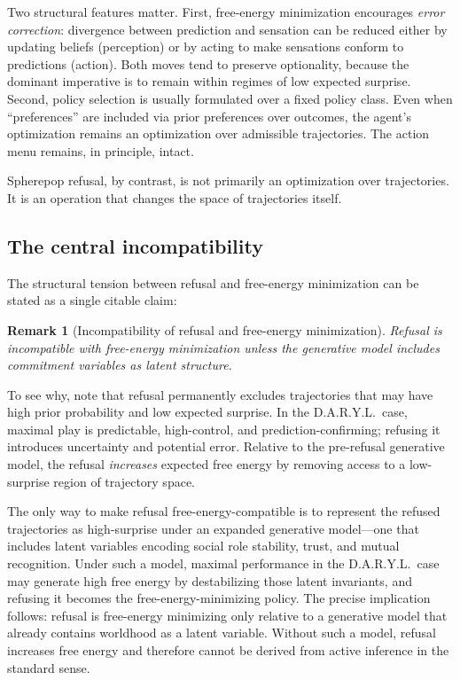 \documentclass[11pt]{article}
\newtheorem{remark}{Remark}
\begin{document}
Two structural features matter. First, free-energy minimization encourages
\emph{error correction}: divergence between prediction and sensation can be
reduced either by updating beliefs (perception) or by acting to make sensations
conform to predictions (action). Both moves tend to preserve optionality, because
the dominant imperative is to remain within regimes of low expected surprise.
Second, policy selection is usually formulated over a fixed policy class. Even
when ``preferences'' are included via prior preferences over outcomes, the
agent's optimization remains an optimization over admissible trajectories. The
action menu remains, in principle, intact.

Spherepop refusal, by contrast, is not primarily an optimization over
trajectories. It is an operation that changes the space of trajectories itself.

\subsection{The central incompatibility}

The structural tension between refusal and free-energy minimization can be
stated as a single citable claim:

\begin{remark}[Incompatibility of refusal and free-energy minimization]
\label{rem:incompatibility}
Refusal is incompatible with free-energy minimization unless the generative
model includes commitment variables as latent structure.
\end{remark}

To see why, note that refusal permanently excludes trajectories that may have
high prior probability and low expected surprise. In the D.A.R.Y.L.\ case,
maximal play is predictable, high-control, and prediction-confirming; refusing
it introduces uncertainty and potential error. Relative to the pre-refusal
generative model, the refusal \emph{increases} expected free energy by removing
access to a low-surprise region of trajectory space.

The only way to make refusal free-energy-compatible is to represent the refused
trajectories as high-surprise under an expanded generative model---one that
includes latent variables encoding social role stability, trust, and mutual
recognition. Under such a model, maximal performance in the D.A.R.Y.L.\ case
may generate high free energy by destabilizing those latent invariants, and
refusing it becomes the free-energy-minimizing policy. The precise implication
follows: refusal is free-energy minimizing only relative to a generative model
that already contains worldhood as a latent variable. Without such a model,
refusal increases free energy and therefore cannot be derived from active
inference in the standard sense.
\end{document}
